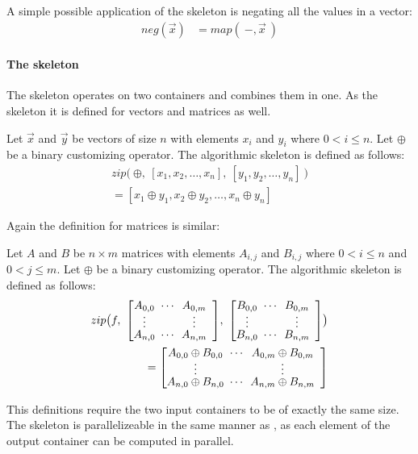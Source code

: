 A simple possible application of the \map skeleton is negating all the values in a vector:
\begin{align*}
  neg(\vec{x}) &= map(\ -, \vec{x}\ )
\end{align*}


\paragraph{The \zip skeleton}
The \zip skeleton operates on two containers and combines them in one.
As the \map skeleton it is defined for vectors and matrices as well.
\begin{definition}
  \label{definition:zip}
  Let $\vec{x}$ and $\vec{y}$ be vectors of size $n$ with elements $x_i$ and $y_i$ where $0 < i \leq n$.
  Let $\oplus$ be a binary customizing operator.
  The algorithmic skeleton \zip is defined as follows:
  \begin{equation}
    \begin{split}
    zip \big(\ \oplus,\ [x_1, x_2, \dots, x_n],\ [y_1, y_2, \dots, y_n]\ \big)\\
      = [x_1 \oplus y_1, x_2 \oplus y_2, \dots, x_n \oplus y_n]
    \end{split}
  \end{equation}
\end{definition}
\noindent
Again the definition for matrices is similar:
\begin{definition}
  \label{definition:zip:matrix}
  Let $A$ and $B$ be $n\times m$ matrices with elements $A_{i,j}$ and $B_{i,j}$ where $0 < i \leq n$ and $0 < j \leq m$.
  Let $\oplus$ be a binary customizing operator.
  The algorithmic skeleton \zip is defined as follows:
  \begin{equation}
    \begin{split}
    zip\big( f,\ {\DottedMatrix{A_{0,0}}{A_{0,m}}{A_{n,0}}{A_{n,m}}},\
                 {\DottedMatrix{B_{0,0}}{B_{0,m}}{B_{n,0}}{B_{n,m}}}\big) \\
      = \DottedMatrix{A_{0,0} \oplus B_{0,0}}{A_{0,m} \oplus B_{0,m}}{A_{n,0} \oplus B_{n,0}}{A_{n,m} \oplus B_{n,m}}
    \end{split}
  \end{equation}
\end{definition}
\noindent
This definitions require the two input containers to be of exactly the same size.
The \zip skeleton is parallelizeable in the same manner as \map, as each element of the output container can be computed in parallel.

